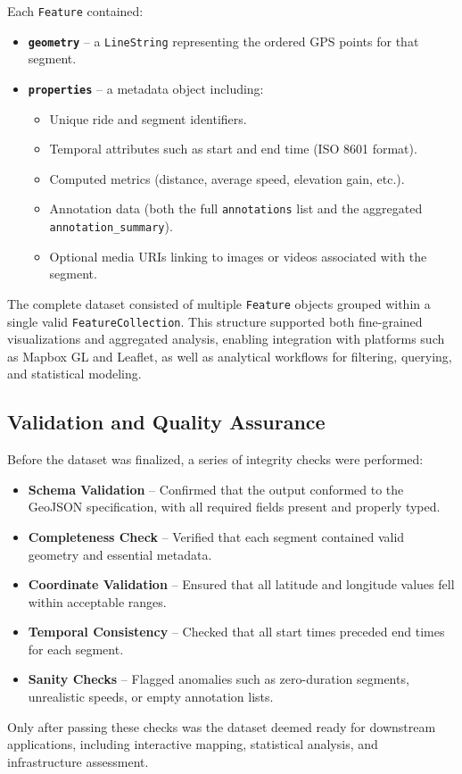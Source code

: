 Each \texttt{Feature} contained:
\begin{itemize}
    \item \textbf{\texttt{geometry}} – a \texttt{LineString} representing the ordered GPS points for that segment.
    \item \textbf{\texttt{properties}} – a metadata object including:
    \begin{itemize}
        \item Unique ride and segment identifiers.
        \item Temporal attributes such as start and end time (ISO 8601 format).
        \item Computed metrics (distance, average speed, elevation gain, etc.).
        \item Annotation data (both the full \texttt{annotations} list and the aggregated \texttt{annotation\_summary}).
        \item Optional media URIs linking to images or videos associated with the segment.
    \end{itemize}
\end{itemize}

The complete dataset consisted of multiple \texttt{Feature} objects grouped within a single valid \texttt{FeatureCollection}. This structure supported both fine-grained visualizations and aggregated analysis, enabling integration with platforms such as Mapbox GL and Leaflet, as well as analytical workflows for filtering, querying, and statistical modeling.

\subsection{Validation and Quality Assurance}

Before the dataset was finalized, a series of integrity checks were performed:

\begin{itemize}
    \item \textbf{Schema Validation} – Confirmed that the output conformed to the GeoJSON specification, with all required fields present and properly typed.
    \item \textbf{Completeness Check} – Verified that each segment contained valid geometry and essential metadata.
    \item \textbf{Coordinate Validation} – Ensured that all latitude and longitude values fell within acceptable ranges.
    \item \textbf{Temporal Consistency} – Checked that all start times preceded end times for each segment.
    \item \textbf{Sanity Checks} – Flagged anomalies such as zero-duration segments, unrealistic speeds, or empty annotation lists.
\end{itemize}

Only after passing these checks was the dataset deemed ready for downstream applications, including interactive mapping, statistical analysis, and infrastructure assessment.
